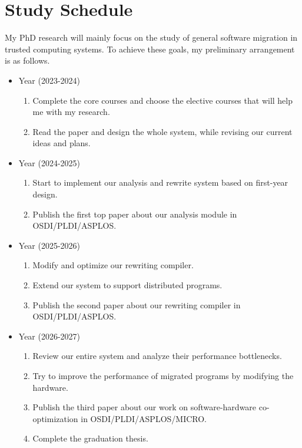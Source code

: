 \section{Study Schedule}
My PhD research will mainly focus on the study of general software migration in trusted computing systems.
To achieve these goals, my preliminary arrangement is as follows.
\begin{itemize}
    \item {} Year (2023-2024)
    \begin{enumerate}
        \item Complete the core courses and choose the elective courses
        that will help me with my research.
        \item Read the paper and design the whole system, while revising
        our current ideas and plans.
    \end{enumerate}
    \item {} Year (2024-2025)
        \begin{enumerate}
            \item Start to implement our analysis and rewrite system based on
            first-year design.
            \item Publish the first top paper about our analysis module in OSDI/PLDI/ASPLOS.
        \end{enumerate}
    \item {} Year (2025-2026)
        \begin{enumerate}
            \item Modify and optimize our rewriting compiler.
            \item Extend our system to support distributed programs.
            \item Publish the second paper about our rewriting compiler in OSDI/PLDI/ASPLOS.
        \end{enumerate}
    \item {} Year (2026-2027)
        \begin{enumerate}
            \item Review our entire system and analyze their performance bottlenecks.
            \item Try to improve the performance of migrated programs by
            modifying the hardware.
            \item Publish the third paper about our work on software-hardware co-optimization in OSDI/PLDI/ASPLOS/MICRO.
            \item Complete the graduation thesis.
        \end{enumerate}
\end{itemize}

